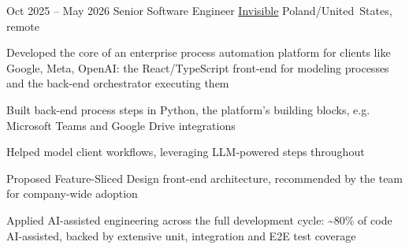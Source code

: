 \begin{sectionlist}
    \jobentry
        {Oct 2025 -- May 2026}
        {Senior Software Engineer}
        {\href{https://invisibletech.ai}{Invisible}}
        {Poland/United~States, remote}
        {
            \begin{jobentrylist}
                \item Developed the core of an enterprise process automation
                    platform for clients like Google, Meta, OpenAI: the
                    React/TypeScript front-end for modeling processes and the
                    back-end orchestrator executing them
                \item Built back-end process steps in Python, the platform’s
                    building blocks, e.g. Microsoft Teams and Google Drive
                    integrations
                \item Helped model client workflows, leveraging LLM-powered
                    steps throughout
                \item Proposed Feature-Sliced Design front-end architecture,
                    recommended by the team for company-wide adoption
                \item Applied AI-assisted engineering across the full development cycle:
                  \textasciitilde{}80\% of code AI-assisted, backed by extensive unit,
                  integration and E2E test coverage
            \end{jobentrylist}
        }


\end{sectionlist}
